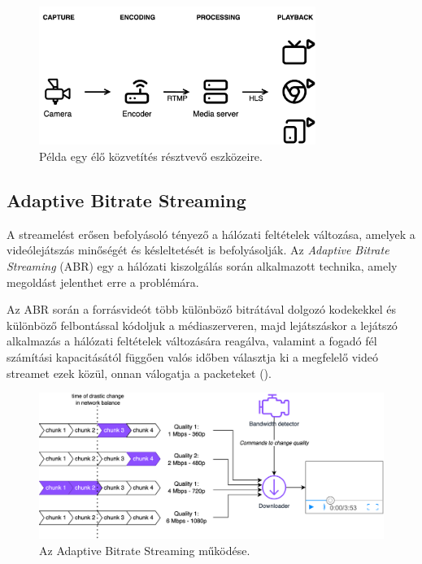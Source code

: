 \begin{figure}[h]
	\centering
	\includegraphics[width=90mm, keepaspectratio]{figures/dipterv_livesetup.png}
	\caption{Példa egy élő közvetítés résztvevő eszközeire.}
	\label{fig:livesetup}
\end{figure}

\subsection{Adaptive Bitrate Streaming}

A streamelést erősen befolyásoló tényező a hálózati feltételek változása, amelyek a videólejátszás minőségét és késleltetését is befolyásolják. Az \emph{Adaptive Bitrate Streaming} (ABR) egy a hálózati kiszolgálás során alkalmazott technika, amely megoldást jelenthet erre a problémára.

Az ABR során a forrásvideót több különböző bitrátával dolgozó kodekekkel és különböző felbontással kódoljuk a médiaszerveren, majd lejátszáskor a lejátszó alkalmazás a hálózati feltételek változására reagálva, valamint a fogadó fél számítási kapacitásától függően valós időben választja ki a megfelelő videó streamet ezek közül, onnan válogatja a packeteket ().

\begin{figure}[h]
	\centering
	\includegraphics[width=140mm, keepaspectratio]{figures/dipterv_abr.png}
	\caption{Az Adaptive Bitrate Streaming működése.}
	\label{fig:ABR}
\end{figure}

